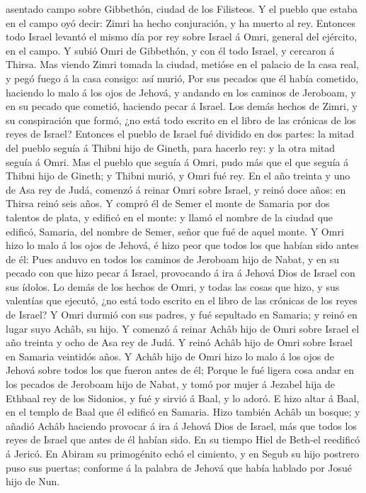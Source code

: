 asentado campo sobre Gibbethón, ciudad de los Filisteos. 
Y el pueblo que estaba en el campo oyó decir: Zimri ha hecho
conjuración, y ha muerto al rey. Entonces todo Israel levantó el mismo
día por rey sobre Israel á Omri, general del ejército, en el campo.
 Y subió Omri de Gibbethón, y con él todo Israel, y
cercaron á Thirsa.  Mas viendo Zimri tomada la ciudad,
metióse en el palacio de la casa real, y pegó fuego á la casa consigo:
así murió,  Por sus pecados que él había cometido,
haciendo lo malo á los ojos de Jehová, y andando en los caminos de
Jeroboam, y en su pecado que cometió, haciendo pecar á Israel.
 Los demás hechos de Zimri, y su conspiración que formó,
¿no está todo escrito en el libro de las crónicas de los reyes de
Israel?  Entonces el pueblo de Israel fué dividido en dos
partes: la mitad del pueblo seguía á Thibni hijo de Gineth, para hacerlo
rey: y la otra mitad seguía á Omri.  Mas el pueblo que
seguía á Omri, pudo más que el que seguía á Thibni hijo de Gineth; y
Thibni murió, y Omri fué rey.  En el año treinta y uno de
Asa rey de Judá, comenzó á reinar Omri sobre Israel, y reinó doce años:
en Thirsa reinó seis años.  Y compró él de Semer el monte
de Samaria por dos talentos de plata, y edificó en el monte: y llamó el
nombre de la ciudad que edificó, Samaria, del nombre de Semer, señor que
fué de aquel monte.  Y Omri hizo lo malo á los ojos de
Jehová, é hizo peor que todos los que habían sido antes de él:
 Pues anduvo en todos los caminos de Jeroboam hijo de
Nabat, y en su pecado con que hizo pecar á Israel, provocando á ira á
Jehová Dios de Israel con sus ídolos.  Lo demás de los
hechos de Omri, y todas las cosas que hizo, y sus valentías que ejecutó,
¿no está todo escrito en el libro de las crónicas de los reyes de
Israel?  Y Omri durmió con sus padres, y fué sepultado en
Samaria; y reinó en lugar suyo Achâb, su hijo.  Y comenzó
á reinar Achâb hijo de Omri sobre Israel el año treinta y ocho de Asa
rey de Judá.  Y reinó Achâb hijo de Omri sobre Israel en
Samaria veintidós años. Y Achâb hijo de Omri hizo lo malo á los ojos de
Jehová sobre todos los que fueron antes de él;  Porque le
fué ligera cosa andar en los pecados de Jeroboam hijo de Nabat, y tomó
por mujer á Jezabel hija de Ethbaal rey de los Sidonios, y fué y sirvió
á Baal, y lo adoró.  E hizo altar á Baal, en el templo de
Baal que él edificó en Samaria.  Hizo también Achâb un
bosque; y añadió Achâb haciendo provocar á ira á Jehová Dios de Israel,
más que todos los reyes de Israel que antes de él habían sido.
 En su tiempo Hiel de Beth-el reedificó á Jericó. En
Abiram su primogénito echó el cimiento, y en Segub su hijo postrero puso
sus puertas; conforme á la palabra de Jehová que había hablado por Josué
hijo de Nun.

